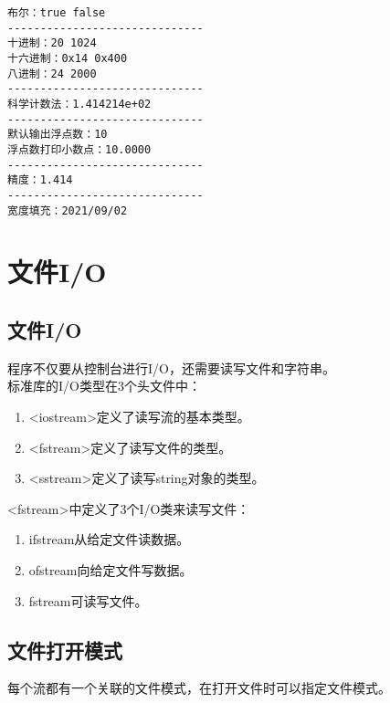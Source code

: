 \begin{tcolorbox}
	\begin{verbatim}
布尔：true false
------------------------------
十进制：20 1024
十六进制：0x14 0x400
八进制：24 2000
------------------------------
科学计数法：1.414214e+02
------------------------------
默认输出浮点数：10
浮点数打印小数点：10.0000
------------------------------
精度：1.414
------------------------------
宽度填充：2021/09/02
	\end{verbatim}
\end{tcolorbox}

\newpage

\section{文件I/O}

\subsection{文件I/O}

程序不仅要从控制台进行I/O，还需要读写文件和字符串。\\

标准库的I/O类型在3个头文件中：

\begin{enumerate}
	\item <iostream>定义了读写流的基本类型。
	\item <fstream>定义了读写文件的类型。
	\item <sstream>定义了读写string对象的类型。
\end{enumerate}

<fstream>中定义了3个I/O类来读写文件：

\begin{enumerate}
	\item ifstream从给定文件读数据。
	\item ofstream向给定文件写数据。
	\item fstream可读写文件。
\end{enumerate}

\vspace{0.5cm}

\subsection{文件打开模式}

每个流都有一个关联的文件模式，在打开文件时可以指定文件模式。

